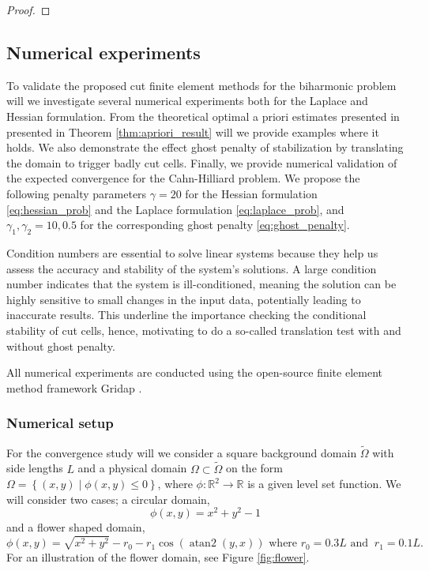 \documentclass[11pt]{article}
\DeclareMathOperator{\atantwo}{atan2}
\theoremstyle{remark}
\renewcommand{\le}{\leqslant}
\numberwithin{equation}{section}
\begin{document}
\begin{proof}
\end{proof}
\subsection{Numerical experiments}%
\label{sec:numerical_results}


To validate the proposed cut finite element methods for the biharmonic problem will we investigate several numerical experiments both for the Laplace and Hessian formulation. From the theoretical optimal a priori estimates presented in presented in Theorem \ref{thm:apriori_result} will we provide examples where it holds. We also demonstrate the effect ghost penalty of stabilization by translating the domain to trigger badly cut cells. Finally, we provide numerical validation of the expected convergence for
the Cahn-Hilliard problem. We propose the following penalty parameters $\gamma = 20$ for the Hessian formulation \eqref{eq:hessian_prob} and the Laplace formulation \eqref{eq:laplace_prob}, and $\gamma _{1}, \gamma _{2} = 10, 0.5$ for the
corresponding ghost penalty \eqref{eq:ghost_penalty}.

Condition numbers are essential to solve linear systems because they help us assess the accuracy and stability of the system's solutions. A large condition number indicates that the system is ill-conditioned, meaning the solution can be highly
sensitive to small changes in the input data, potentially leading to inaccurate results. This underline the importance checking the conditional stability of cut cells, hence, motivating to do a so-called translation test with and without ghost
penalty.

All numerical experiments are conducted using the open-source finite element method framework Gridap \cite{verdugo22}.

\subsubsection{Numerical setup}%
\label{sub:numerical_results_for_cutcip_biharmonic_equation}
For the convergence study will we consider a square background domain $\widetilde{\Omega} $ with side lengths $L$ and a physical domain $\Omega \subset \widetilde{\Omega}$ on the form $\Omega  = \left\{ ( x,y)  \mid \phi ( x,y) \le 0    \right\} $,
where $\phi: \mathbb{R} ^2 \to \mathbb{R}  $ is a given level set function. We will consider two cases; a circular domain,
\begin{equation}
    \label{eq:circle}
\phi( x,y) = x^{ 2} + y^{2} -1
\end{equation}
and a flower shaped domain,
\begin{equation}
\label{eq:flower}
\phi ( x,y) =\sqrt{x^{2} + y^{2}} - r_{0} - r_{1}\cos(\atantwo(y,x)) \text{ where }  r_{0} = 0.3L  \text{ and } \ r_{1} = 0.1L .
\end{equation}
For an illustration of the flower domain, see Figure \ref{fig:flower}.
\end{document}
